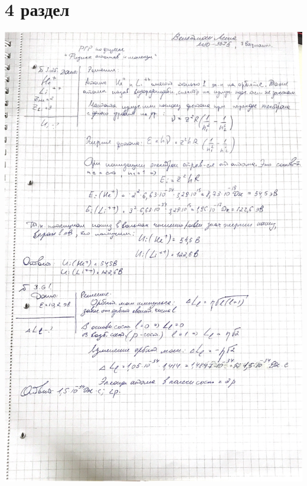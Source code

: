 \documentclass[12pt]{article}
\begin{document}
\section{4 раздел}
\begin{center}
\includegraphics[scale=0.2]{4_1.jpeg}\\
\vfill
\end{center}
\end{document}
